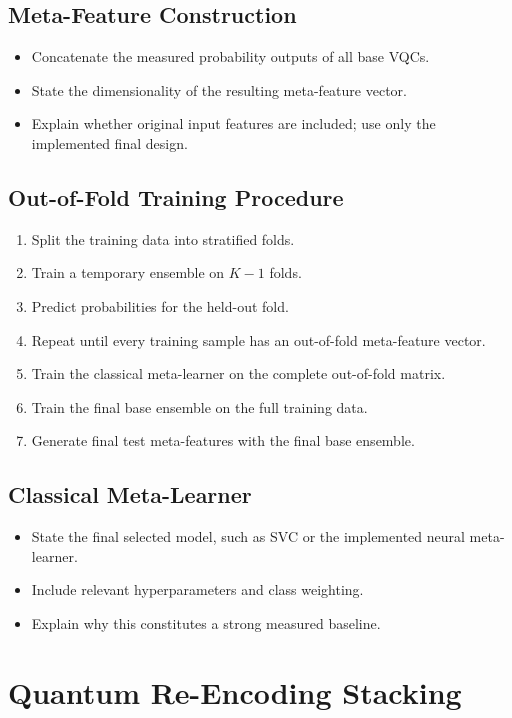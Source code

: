 \documentclass[]{UCD_CS_MSc_AAI_Report}
\begin{document}
\subsection{Meta-Feature Construction}
\begin{itemize}
    \item Concatenate the measured probability outputs of all base VQCs.
    \item State the dimensionality of the resulting meta-feature vector.
    \item Explain whether original input features are included; use only the implemented final design.
\end{itemize}

\subsection{Out-of-Fold Training Procedure}
\begin{enumerate}
    \item Split the training data into stratified folds.
    \item Train a temporary ensemble on $K-1$ folds.
    \item Predict probabilities for the held-out fold.
    \item Repeat until every training sample has an out-of-fold meta-feature vector.
    \item Train the classical meta-learner on the complete out-of-fold matrix.
    \item Train the final base ensemble on the full training data.
    \item Generate final test meta-features with the final base ensemble.
\end{enumerate}

\subsection{Classical Meta-Learner}
\begin{itemize}
    \item State the final selected model, such as SVC or the implemented neural meta-learner.
    \item Include relevant hyperparameters and class weighting.
    \item Explain why this constitutes a strong measured baseline.
\end{itemize}

\section{Quantum Re-Encoding Stacking}
\label{sec:method-reencoding}
\end{document}
